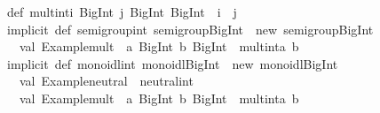 \begin{isabellebody}
\begin{isamarkuptext}
\isanewline
def\ mult{}int{}i{}\ BigInt{}\ j{}\ BigInt{}{}\ BigInt\ {}\ i\ {}\ j\isanewline
\isanewline
implicit\ def\ semigroup{}int{}\ semigroup{}BigInt{}\ {}\ new\ semigroup{}BigInt{}\ {}\isanewline
\ \ val\ {}Example{}mult{}\ {}\ {}a{}\ BigInt{}\ b{}\ BigInt{}\ {}{}\ mult{}int{}a{}\ b{}\isanewline
{}\isanewline
\isanewline
implicit\ def\ monoidl{}int{}\ monoidl{}BigInt{}\ {}\ new\ monoidl{}BigInt{}\ {}\isanewline
\ \ val\ {}Example{}neutral{}\ {}\ neutral{}int\isanewline
\ \ val\ {}Example{}mult{}\ {}\ {}a{}\ BigInt{}\ b{}\ BigInt{}\ {}{}\ mult{}int{}a{}\ b{}\isanewline
{}\isanewline

\end{isamarkuptext}
\end{isabellebody}
